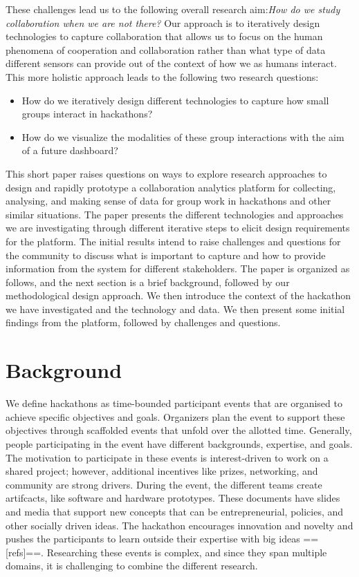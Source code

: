 \documentclass[sigconf,review,anonymous]{acmart}
\begin{document}
These challenges lead us to the following overall research aim:\textit{How do we study collaboration when we are not there?} Our approach is to iteratively design technologies to capture collaboration that allows us to focus on the human phenomena of cooperation and collaboration rather than what type of data different sensors can provide out of the context of how we as humans interact. This more holistic approach leads to the following two research questions: 
\begin{itemize}
    \item How do we iteratively design different technologies to capture how small groups interact in hackathons?
    \item How do we visualize the modalities of these group interactions with the aim of a future dashboard?
\end{itemize}
This short paper raises questions on ways to explore research approaches to design and rapidly prototype a collaboration analytics platform for collecting, analysing, and making sense of data for group work in hackathons and other similar situations. The paper presents the different technologies and approaches we are investigating through different iterative steps to elicit design requirements for the platform. The initial results intend to raise challenges and questions for the community to discuss what is important to capture and how to provide information from the system for different stakeholders. The paper is organized as follows, and the next section is a brief background, followed by our methodological design approach. We then introduce the context of the hackathon we have investigated and the technology and data. We then present some initial findings from the platform, followed by challenges and questions.

\section{Background}
We define hackathons as time-bounded participant events that are organised to achieve specific objectives and goals. Organizers plan the event to support these objectives through scaffolded events that unfold over the allotted time. Generally, people participating in the event have different backgrounds, expertise, and goals. The motivation to participate in these events is interest-driven to work on a shared project; however, additional incentives like prizes, networking, and community are strong drivers. During the event, the different teams create artifcacts, like software and hardware prototypes. These documents have slides and media that support new concepts that can be entrepreneurial, policies, and other socially driven ideas. The hackathon encourages innovation and novelty and pushes the participants to learn outside their expertise with big ideas ==[refs]==.  Researching these events is complex, and since they span multiple domains, it is challenging to combine the different research. 
\end{document}
